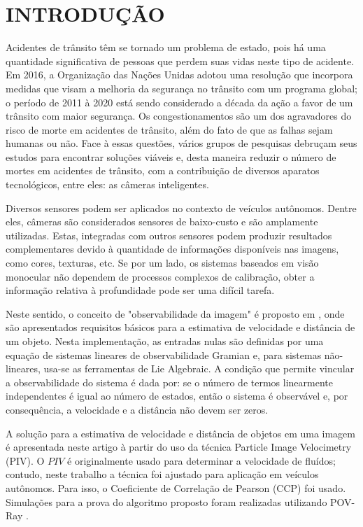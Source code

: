 \section{INTRODUÇÃO}

Acidentes de trânsito têm se tornado um problema de estado, pois há uma quantidade significativa de pessoas que
perdem suas vidas neste tipo de acidente. Em 2016, a Organização das Nações Unidas adotou uma 
resolução que incorpora medidas que visam 
a melhoria da segurança no trânsito com um programa global; 
o período de 2011 à 2020 está sendo considerado a década da ação a favor
de um trânsito com maior segurança.
Os congestionamentos são um dos agravadores do risco de morte em acidentes de trânsito, 
além do fato de que as falhas sejam humanas ou não. 
Face à essas questões, vários grupos de pesquisas debruçam seus estudos 
para encontrar soluções viáveis e, desta maneira
reduzir o número de mortes em acidentes de trânsito, com a 
contribuição de diversos aparatos tecnológicos, entre eles: as câmeras inteligentes.


Diversos sensores podem ser aplicados no contexto de veículos autônomos. Dentre eles, 
câmeras são considerados sensores de baixo-custo e são amplamente utilizadas. 
Estas, integradas com outros sensores podem produzir resultados complementares devido à 
quantidade de informações disponíveis nas imagens, como cores, texturas, etc. 
Se por um lado, os sistemas baseados em visão monocular não dependem de processos 
complexos de calibração, obter a informação relativa à profundidade pode ser uma difícil 
tarefa.


Neste sentido, o conceito de "observabilidade da imagem" é 
proposto em \cite{Breugel}, onde são apresentados requisitos 
básicos para a estimativa de velocidade e 
distância de um objeto. Nesta implementação, as entradas nulas 
são definidas por uma equação de sistemas lineares de observabilidade Gramian e,
para sistemas não-lineares, usa-se as ferramentas de Lie Algebraic. 
A condição que permite vincular a observabilidade do sistema é dada por:
se o número de termos linearmente independentes é igual ao número de estados, 
então o sistema é observável e, por consequência, a velocidade e a 
distância não devem ser zeros.

A solução para a estimativa de velocidade e distância de objetos em uma imagem é 
apresentada neste artigo à partir do uso da técnica Particle Image Velocimetry (PIV). 
O $PIV$ é originalmente usado para determinar a velocidade de fluídos; contudo, neste trabalho
a técnica foi ajustado para aplicação em veículos autônomos. Para isso, o Coeficiente de 
Correlação de Pearson (CCP) \cite{Miranda Neto} foi usado. Simulações 
para a prova do algoritmo proposto foram realizadas utilizando POV-Ray \cite{povray}.




















